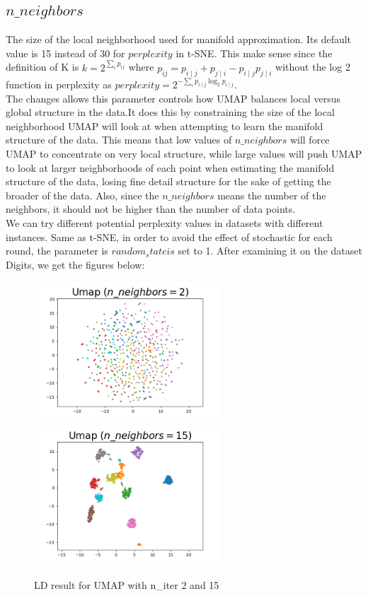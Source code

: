 \subsection{$n\_neighbors$}

The size of the local neighborhood used for manifold approximation.  Its default value is 15 instead of 30 for $perplexity$ in t-SNE. This make sense since the definition of K is $k = 2^{\sum_i p_{ij}}$ where $p_{ij} = p_{i\mid j} + p_{j\mid i} - p_{i\mid j}p_{j\mid i}$ without the log 2 function in perplexity as $perplexity = 2^{-\sum_i p_{i \mid j} \log_2 p_{i \mid j} }$. \\

\noindent The changes allows this parameter controls how UMAP balances local versus global structure in the data.It does this by constraining the size of the local neighborhood UMAP will look at when attempting to learn the manifold structure of the data. This means that low values of $n\_neighbors$ will force UMAP to concentrate on very local structure, while large values will push UMAP to look at larger neighborhoods of each point when estimating the manifold structure of the data, losing fine detail structure for the sake of getting the broader of the data. Also, since the $n\_neighbors$ means the number of the neighbors, it should not be higher than the number of data points.\\

\noindent We can try different potential perplexity values in datasets with different instances. Same as t-SNE, in order to avoid the effect of stochastic for each round, the parameter is $random_stateis$ set to 1. After examining it on the dataset Digits, we get the figures below:

\begin{figure}[H]
\centering  %
{
\label{Fig.sub.1}
\includegraphics[width=7cm,height=3.5cm\textwidth]{images/umap/umap_digit_n_neighbor_2.png}}
{
\label{Fig.sub.2}
\includegraphics[width=7cm,height=3.5cm\textwidth]{images/umap/umap_digit_n_neighbor_15.png}}
\caption{LD result for UMAP with n\_iter 2 and 15}
\end{figure}

